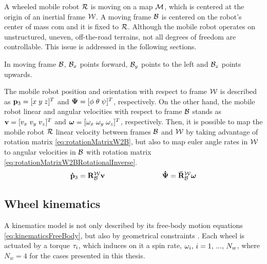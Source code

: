A wheeled mobile robot $\mathcal{R}$ is moving on a map $\mathcal{M}$, which is centered at the origin of an inertial frame $\mathcal{W}$. A moving frame $\mathcal{B}$ is centered on the robot's center of mass \acrshort{com} and it is fixed to $\mathcal{R}$. Although the mobile robot operates on unstructured, uneven, off-the-road terrains, not all degrees of freedom are controllable. This issue is addressed in the following sections.

\begin{assumption}
	In moving frame $\mathcal{B}$, $\mathcal{B}_x$ points forward, $\mathcal{B}_y$ points to the left and $\mathcal{B}_z$ points upwards.
	\label{assumption:frames}
\end{assumption}

The mobile robot position and orientation with respect to frame $\mathcal{W}$ is described as $\mathbf{p}_3 = [x\;  y\; z]^T$ and $\bm{\Orientation} = [\roll \; \pitch \; \yaw]^T$, respectively. On the other hand, the mobile robot linear and angular velocities with respect to frame $\mathcal{B}$ stands as $\mathbf{v} = [ v_x\;v_y\;v_z ]^T$ and $\bm{\AngVelocity} = [\AngVelocity_x\;\AngVelocity_y\;\AngVelocity_z]^T$, respectively. Then, it is possible to map the mobile robot $\mathcal{R}$ linear velocity between frames $\mathcal{B}$ and $\mathcal{W}$ by taking advantage of rotation matrix \eqref{eq:rotationMatrixW2B}, but also to map euler angle rates in $\mathcal{W}$ to angular velocities in $\mathcal{B}$ with rotation matrix \eqref{eq:rotationMatrixW2BRotationalInverse}.
\begin{equation}
	\begin{matrix}
		\DerMathBold{\Position}_3 = \mathbf{\RotMatrix}_{\BodyFrame}^{\WorldFrame} \mathbf{\LinVelocity} & & & & & & & & \DerMathBold{\Orientation} = \mathbf{\bar{\RotMatrix}}_{\BodyFrame}^{\WorldFrame} \bm{\AngVelocity}
	\end{matrix}
	\label{eq:kinematicsFreeBody}
\end{equation}

\subsection*{Wheel kinematics}
\label{subsection:wheelKinematics}

A kinematics model is not only described by its free-body motion equations \eqref{eq:kinematicsFreeBody}, but also by geometrical constraints \cite{Kozlowski2004}. Each wheel is actuated by a torque $\tau_i$, which induces on it a spin rate, $\omega_i,\, i = 1,\,...,\,N_w$, where $N_w = 4$ for the cases presented in this thesis.

